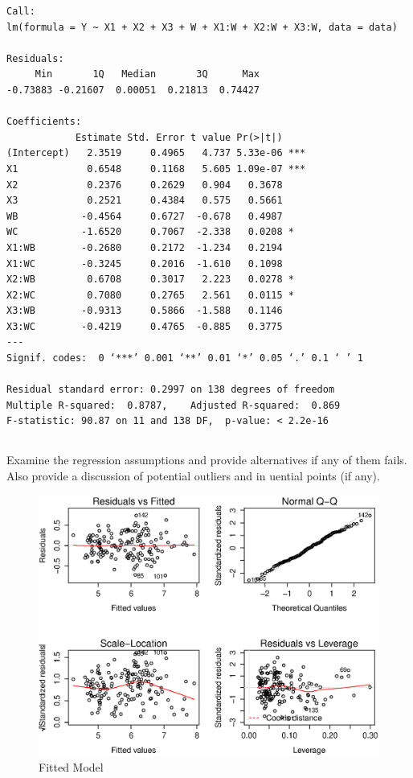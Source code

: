 \documentclass{article}
\begin{document}
  \begin{lstlisting}
Call:
lm(formula = Y ~ X1 + X2 + X3 + W + X1:W + X2:W + X3:W, data = data)

Residuals:
     Min       1Q   Median       3Q      Max 
-0.73883 -0.21607  0.00051  0.21813  0.74427 

Coefficients:
            Estimate Std. Error t value Pr(>|t|)    
(Intercept)   2.3519     0.4965   4.737 5.33e-06 ***
X1            0.6548     0.1168   5.605 1.09e-07 ***
X2            0.2376     0.2629   0.904   0.3678    
X3            0.2521     0.4384   0.575   0.5661    
WB           -0.4564     0.6727  -0.678   0.4987    
WC           -1.6520     0.7067  -2.338   0.0208 *  
X1:WB        -0.2680     0.2172  -1.234   0.2194    
X1:WC        -0.3245     0.2016  -1.610   0.1098    
X2:WB         0.6708     0.3017   2.223   0.0278 *  
X2:WC         0.7080     0.2765   2.561   0.0115 *  
X3:WB        -0.9313     0.5866  -1.588   0.1146    
X3:WC        -0.4219     0.4765  -0.885   0.3775    
---
Signif. codes:  0 ‘***’ 0.001 ‘**’ 0.01 ‘*’ 0.05 ‘.’ 0.1 ‘ ’ 1

Residual standard error: 0.2997 on 138 degrees of freedom
Multiple R-squared:  0.8787,	Adjusted R-squared:  0.869 
F-statistic: 90.87 on 11 and 138 DF,  p-value: < 2.2e-16
  \end{lstlisting}
  
\subsection{}
Examine the regression assumptions and provide alternatives if any of them
fails. Also provide a discussion of potential outliers and in uential points (if
any).

  \begin{figure}[H]
  \centering
  \includegraphics[scale=0.6]{fittedmodel1.eps}
  \caption{Fitted Model}
  \label{fig:fittedmodel1}
  \end{figure}
\end{document}

